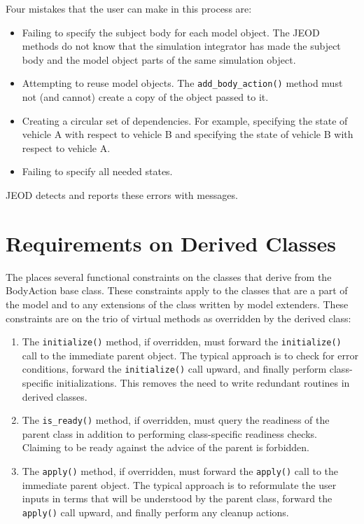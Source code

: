 Four mistakes that the user can make in this process are:
\begin{itemize}
\item Failing to specify the subject body for each model object.
The JEOD methods do not know that the simulation integrator has made the
subject body and the model object parts of the same simulation object.
\item Attempting to reuse model objects. The {\tt add\_body\_action()}
method must not (and cannot) create a copy of the object passed to it.
\item Creating a circular set of dependencies. For example,
specifying the state of vehicle A with respect to vehicle B and
specifying the state of vehicle B with respect to vehicle A.
\item Failing to specify all needed states.
\end{itemize}
JEOD detects and reports these errors with messages.

\section*{Requirements on Derived Classes}
The \ModelDesc places several functional constraints on the classes
that derive from the BodyAction base class.
These constraints apply to the classes that are a part of the model
and to any extensions of the class written by model extenders.
These constraints are on the trio of virtual methods as overridden
by the derived class:
\begin{enumerate}
\item The {\tt initialize()} method, if overridden,
must forward the {\tt initialize()} call to the immediate parent object.
The typical approach is to check for error conditions,
forward the {\tt initialize()} call  upward, and finally perform
class-specific initializations. This removes the need to write redundant
routines in derived classes.
\item The {\tt is\_ready()} method, if overridden,
must query the readiness of the parent class in addition to
performing class-specific readiness checks. Claiming to be ready
against the advice of the parent is forbidden.
\item The {\tt apply()} method, if overridden,
must forward the {\tt apply()} call to the immediate parent object.
The typical approach is to reformulate the user inputs in terms
that will be understood by the parent class,
forward the {\tt apply()} call  upward, and finally perform
any cleanup actions.
\end{enumerate}

